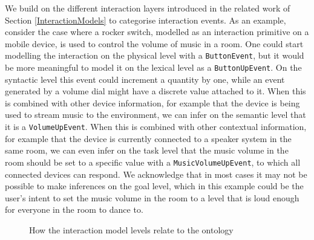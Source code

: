 We build on the different interaction layers introduced in the related work of Section \ref{InteractionModels} to categorise interaction events. As an example, consider the case where a rocker switch, modelled as an interaction primitive on a mobile device, is used to control the volume of music in a room. One could start modelling the interaction on the physical level with a \texttt{ButtonEvent}, but it would be more meaningful to model it on the lexical level as a \texttt{ButtonUpEvent}. On the syntactic level this event could increment a quantity by one, while an event generated by a volume dial might have a discrete value attached to it. When this is combined with other device information, for example that the device is being used to stream music to the environment, we can infer on the semantic level that it is a \texttt{VolumeUpEvent}. When this is combined with other contextual information, for example that the device is currently connected to a speaker system in the same room, we can even infer on the task level that the music volume in the room should be set to a specific value with a \texttt{MusicVolumeUpEvent}, to which all connected devices can respond. We acknowledge that in most cases it may not be possible to make inferences on the goal level, which in this example could be the user's intent to set the music volume in the room to a level that is loud enough for everyone in the room to dance to.

\begin{figure}[bth]
	\caption{How the interaction model levels relate to the ontology}
	\label{InteractionModelToOntology}        
\end{figure}

